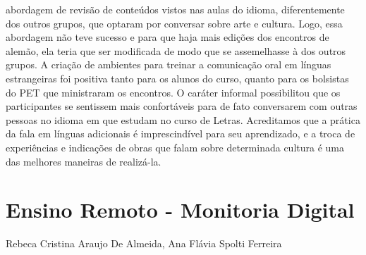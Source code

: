 abordagem de revisão de conteúdos vistos nas aulas do idioma, diferentemente dos outros
grupos, que optaram por conversar sobre arte e cultura. Logo, essa abordagem não teve sucesso e
para que haja mais edições dos encontros de alemão, ela teria que ser modificada de modo que
se assemelhasse à dos outros grupos.
A criação de ambientes para treinar a comunicação oral em línguas estrangeiras foi positiva
tanto para os alunos do curso, quanto para os bolsistas do PET que ministraram os encontros. O
caráter informal possibilitou que os participantes se sentissem mais confortáveis para de fato
conversarem com outras pessoas no idioma em que estudam no curso de Letras. Acreditamos
que a prática da fala em línguas adicionais é imprescindível para seu aprendizado, e a troca de
experiências e indicações de obras que falam sobre determinada cultura é uma das melhores
maneiras de realizá-la.



\section{Ensino Remoto - Monitoria Digital}

Rebeca Cristina Araujo De Almeida, Ana Flávia Spolti Ferreira

